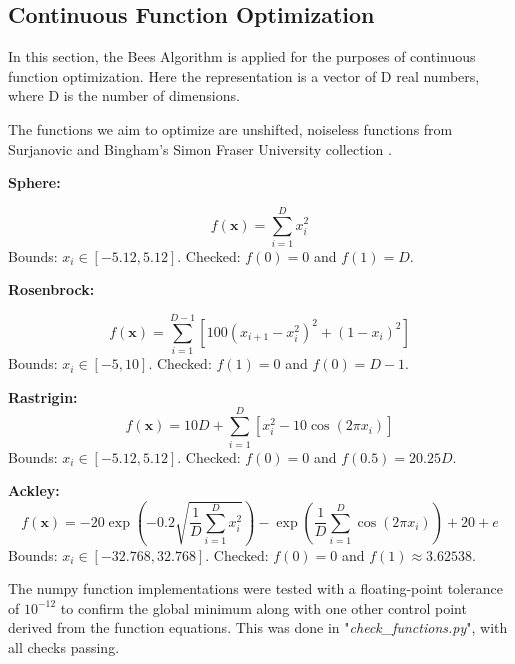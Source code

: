 \subsection{Continuous Function Optimization}
In this section, the Bees Algorithm is applied for the purposes of continuous function optimization.
Here the representation is a vector of D real numbers, where D is the number of dimensions.

The functions we aim to optimize are unshifted, noiseless functions from Surjanovic and Bingham's Simon Fraser University collection \cite{surjanovic_bingham}. 

\textbf{Sphere:} 

\begin{equation}
    f(\mathbf{x})=\sum_{i=1}^{D}x_i^2
\end{equation}
Bounds: \(x_i \in [-5.12,5.12]\). Checked: \(f(0)=0\) and \(f(1) = D\).

\textbf{Rosenbrock:}

\begin{equation}
    f(\mathbf{x})=\sum_{i=1}^{D-1}[100(x_{i+1}-x_i^2)^2+(1-x_i)^2]
\end{equation}
Bounds: \(x_i \in [-5,10]\). Checked: \(f(1)=0\) and \(f(0)=D-1\).

\textbf{Rastrigin:}
\begin{equation}
    f(\mathbf{x})=10D+\sum_{i=1}^{D}[x_i^2-10\cos(2\pi x_i)]
\end{equation}
Bounds: \(x_i \in [-5.12,5.12]\). Checked: \(f(0)=0\) and \(f(0.5)=20.25D\).

\textbf{Ackley:}
\begin{equation}
    f(\mathbf{x}) = -20 \exp\left(-0.2 \sqrt{\frac{1}{D} \sum_{i=1}^{D} x_i^2}\right) - \exp\left(\frac{1}{D} \sum_{i=1}^{D} \cos(2\pi x_i)\right) + 20 + e
\end{equation}
Bounds: \(x_i \in [-32.768,32.768]\). Checked: \(f(0)=0\) and \(f(1) \approx 3.62538\).

The numpy function implementations were tested with a floating-point tolerance of $10^{-12}$ to confirm the global minimum along with one other control point derived from the function equations. This was done in "\textit{check\_functions.py}", with all checks passing.

\vfill

